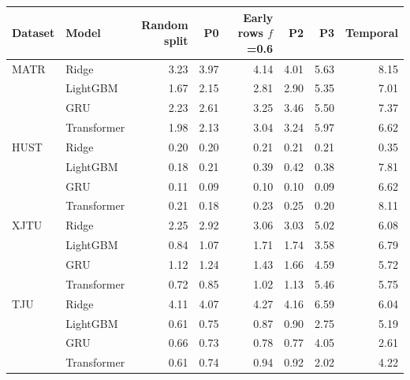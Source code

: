 \begin{tabular}{llrrrrrr}
\toprule
Dataset & Model & Random split & P0 & Early rows $f$=0.6 & P2 & P3 & Temporal \\
\midrule
MATR & Ridge & 3.23 & 3.97 & 4.14 & 4.01 & 5.63 & 8.15 \\
 & LightGBM & 1.67 & 2.15 & 2.81 & 2.90 & 5.35 & 7.01 \\
 & GRU & 2.23 & 2.61 & 3.25 & 3.46 & 5.50 & 7.37 \\
 & Transformer & 1.98 & 2.13 & 3.04 & 3.24 & 5.97 & 6.62 \\
HUST & Ridge & 0.20 & 0.20 & 0.21 & 0.21 & 0.21 & 0.35 \\
 & LightGBM & 0.18 & 0.21 & 0.39 & 0.42 & 0.38 & 7.81 \\
 & GRU & 0.11 & 0.09 & 0.10 & 0.10 & 0.09 & 6.62 \\
 & Transformer & 0.21 & 0.18 & 0.23 & 0.25 & 0.20 & 8.11 \\
XJTU & Ridge & 2.25 & 2.92 & 3.06 & 3.03 & 5.02 & 6.08 \\
 & LightGBM & 0.84 & 1.07 & 1.71 & 1.74 & 3.58 & 6.79 \\
 & GRU & 1.12 & 1.24 & 1.43 & 1.66 & 4.59 & 5.72 \\
 & Transformer & 0.72 & 0.85 & 1.02 & 1.13 & 5.46 & 5.75 \\
TJU & Ridge & 4.11 & 4.07 & 4.27 & 4.16 & 6.59 & 6.04 \\
 & LightGBM & 0.61 & 0.75 & 0.87 & 0.90 & 2.75 & 5.19 \\
 & GRU & 0.66 & 0.73 & 0.78 & 0.77 & 4.05 & 2.61 \\
 & Transformer & 0.61 & 0.74 & 0.94 & 0.92 & 2.02 & 4.22 \\
\bottomrule
\end{tabular}
